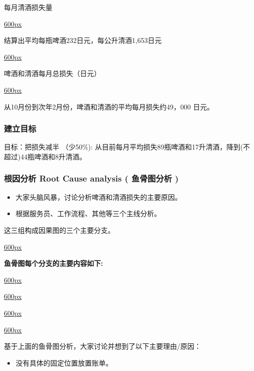 每月清酒损失量

\href{文件:club7.2.jpg}{600px}

结算出平均每瓶啤酒232日元，每公升清酒1,653日元

\href{文件:club8.1.jpg}{600px}

啤酒和清酒每月总损失（日元）

\href{文件:club9.1.jpg}{600px}

从10月份到次年2月份，啤酒和清酒的平均每月损失约49，000 日元。

\hypertarget{ux5efaux7acbux76eeux6807}{%
\subsubsection{建立目标}\label{ux5efaux7acbux76eeux6807}}

目标：把损失减半 （少50\%):
从目前每月平均损失89瓶啤酒和17升清酒，降到(不超过)44瓶啤酒和8升清酒。

\hypertarget{ux6839ux56e0ux5206ux6790-root-cause-analysis-ux9c7cux9aa8ux56feux5206ux6790}{%
\subsubsection{根因分析 Root Cause analysis ( 鱼骨图分析
)}\label{ux6839ux56e0ux5206ux6790-root-cause-analysis-ux9c7cux9aa8ux56feux5206ux6790}}

\begin{itemize}
\tightlist
\item
  大家头脑风暴，讨论分析啤酒和清酒损失的主要原因。
\item
  根据服务员、工作流程、其他等三个主线分析。
\end{itemize}

这三组构成因果图的三个主要分支。

\href{文件:club11111.jpg}{600px}

\textbf{鱼骨图每个分支的主要内容如下:}

\href{文件:418页替换图片.jpg}{600px}

\href{文件:club13.1.1.jpg}{600px}

\href{文件:419页替换图片.jpg}{600px}

\href{文件:420页替换图片.jpg}{600px}

基于上面的鱼骨图分析，大家讨论并想到了以下主要理由/原因：

\begin{itemize}
\tightlist
\item
  没有具体的固定位置放置账单。
\end{itemize}

